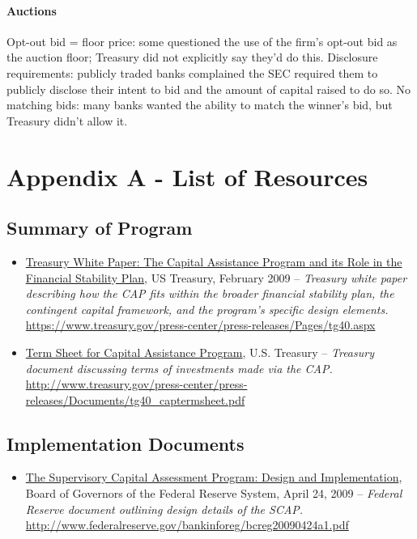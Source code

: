 \documentclass[12pt]{article}
\begin{document}
\paragraph{Auctions}

Opt-out bid = floor price:  some questioned the use of the firm's opt-out bid as the auction floor; Treasury did not explicitly say they'd do this. 
Disclosure requirements: publicly traded banks complained the SEC required them to publicly disclose their intent to bid and the amount of capital raised to do so.
No matching bids: many banks wanted the ability to match the winner's bid, but Treasury didn't allow it.




\nocite{*}


\section{Appendix A - List of Resources}

\subsection{Summary of Program}

\begin{itemize}

\item
\ul{Treasury White Paper: The Capital Assistance Program and its Role in the Financial Stability Plan}, US Treasury, February 2009 -- \emph{Treasury white paper describing how the CAP fits within the broader financial stability plan, the contingent capital framework, and the program's specific design elements.} \url{https://www.treasury.gov/press-center/press-releases/Pages/tg40.aspx}
\item
\ul{Term
  Sheet for Capital Assistance Program}, U.S. Treasury -- \emph{Treasury
  document discussing terms of investments made via the CAP.} \url{http://www.treasury.gov/press-center/press-releases/Documents/tg40_captermsheet.pdf}
\end{itemize}

\subsection{Implementation Documents}
\begin{itemize}
\item
\ul{The
  Supervisory Capital Assessment Program: Design and Implementation},
  Board of Governors of the Federal Reserve System, April 24, 2009 -- \emph{Federal Reserve document outlining design details of the SCAP.} \url{http://www.federalreserve.gov/bankinforeg/bcreg20090424a1.pdf}
\end{itemize}
\end{document}
